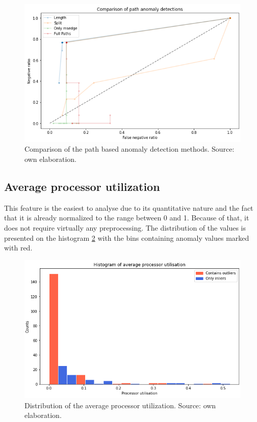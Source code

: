 \documentclass[a4paper,twoside,12pt]{book}
\begin{document}
\begin{figure}
	\centering
	\includegraphics[scale=0.9]{images/PathCompGraph2}
	\caption{Comparison of the path based anomaly detection methods. Source: own elaboration.}
	\label{fig:pathcomp}
 \end{figure}

\subsection{Average processor utilization}

This feature is the easiest to analyse due to its quantitative nature and the fact that it is
already normalized to the range between 0 and 1. Because of that, it does not require virtually 
any preprocessing. The distribution of the values is presented on the 
histogram \ref{fig:histavgproc} with the bins containing anomaly values marked with red. 

\begin{figure}
	\centering
	\includegraphics[scale=0.9]{images/HistAvgProcs}
	\caption{Distribution of the average processor utilization. Source: own elaboration.}
	\label{fig:histavgproc}
 \end{figure}
\end{document}
